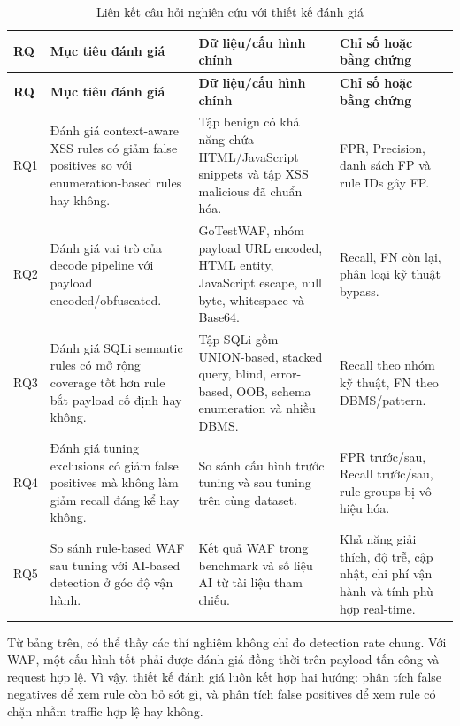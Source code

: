 {\small
\renewcommand{\arraystretch}{1.2}
\begin{longtable}{|C{0.10\textwidth}|L{0.28\textwidth}|L{0.27\textwidth}|L{0.25\textwidth}|}
\caption{Liên kết câu hỏi nghiên cứu với thiết kế đánh giá}\label{tab:rq-evaluation-mapping}\\
\hline
\textbf{RQ} & \textbf{Mục tiêu đánh giá} & \textbf{Dữ liệu/cấu hình chính} & \textbf{Chỉ số hoặc bằng chứng} \\
\hline
\endfirsthead

\hline
\textbf{RQ} & \textbf{Mục tiêu đánh giá} & \textbf{Dữ liệu/cấu hình chính} & \textbf{Chỉ số hoặc bằng chứng} \\
\hline
\endhead

RQ1 & Đánh giá context-aware XSS rules có giảm false positives so với enumeration-based rules hay không. & Tập benign có khả năng chứa HTML/JavaScript snippets và tập XSS malicious đã chuẩn hóa. & FPR, Precision, danh sách FP và rule IDs gây FP. \\
\hline
RQ2 & Đánh giá vai trò của decode pipeline với payload encoded/obfuscated. & GoTestWAF, nhóm payload URL encoded, HTML entity, JavaScript escape, null byte, whitespace và Base64. & Recall, FN còn lại, phân loại kỹ thuật bypass. \\
\hline
RQ3 & Đánh giá SQLi semantic rules có mở rộng coverage tốt hơn rule bắt payload cố định hay không. & Tập SQLi gồm UNION-based, stacked query, blind, error-based, OOB, schema enumeration và nhiều DBMS. & Recall theo nhóm kỹ thuật, FN theo DBMS/pattern. \\
\hline
RQ4 & Đánh giá tuning exclusions có giảm false positives mà không làm giảm recall đáng kể hay không. & So sánh cấu hình trước tuning và sau tuning trên cùng dataset. & FPR trước/sau, Recall trước/sau, rule groups bị vô hiệu hóa. \\
\hline
RQ5 & So sánh rule-based WAF sau tuning với AI-based detection ở góc độ vận hành. & Kết quả WAF trong benchmark và số liệu AI từ tài liệu tham chiếu. & Khả năng giải thích, độ trễ, cập nhật, chi phí vận hành và tính phù hợp real-time. \\
\hline
\end{longtable}
}

Từ bảng trên, có thể thấy các thí nghiệm không chỉ đo detection rate chung. Với WAF, một cấu hình tốt phải được đánh giá đồng thời trên payload tấn công và request hợp lệ. Vì vậy, thiết kế đánh giá luôn kết hợp hai hướng: phân tích false negatives để xem rule còn bỏ sót gì, và phân tích false positives để xem rule có chặn nhầm traffic hợp lệ hay không.

